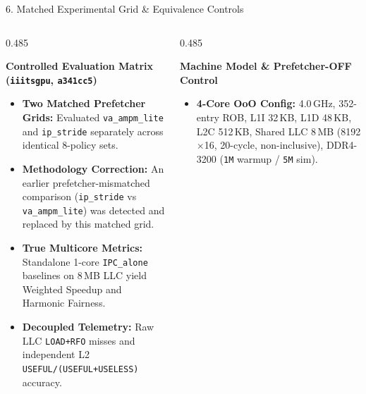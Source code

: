 \documentclass[aspectratio=169, 10pt]{beamer}
\begin{document}
\begin{frame}{6. Matched Experimental Grid \& Equivalence Controls}
  \vspace{-0.15cm}
  \begin{columns}[t, onlytextwidth]
    \begin{column}{0.485\textwidth}
      \begin{tcolorbox}[archpanel]
        {\footnotesize\raggedright\textbf{\color{Obsidian}Controlled Evaluation Matrix (\texttt{iiitsgpu}, \texttt{a341cc5})}\par}\vspace{0.06cm}
        \begin{itemize}\setlength{\itemsep}{0.16em}\scriptsize
          \item \textbf{Two Matched Prefetcher Grids:} Evaluated \texttt{va\_ampm\_lite} and \texttt{ip\_stride} separately across identical 8-policy sets.
          \item \textbf{Methodology Correction:} An earlier prefetcher-mismatched comparison (\texttt{ip\_stride} vs \texttt{va\_ampm\_lite}) was detected and replaced by this matched grid.
          \item \textbf{True Multicore Metrics:} Standalone 1-core \texttt{IPC\_alone} baselines on 8\,MB LLC yield Weighted Speedup and Harmonic Fairness.
          \item \textbf{Decoupled Telemetry:} Raw LLC \texttt{LOAD+RFO} misses and independent L2 \texttt{USEFUL/(USEFUL+USELESS)} accuracy.
        \end{itemize}
      \end{tcolorbox}
    \end{column}%
    \hfill%
    \begin{column}{0.485\textwidth}
      \begin{tcolorbox}[tealpanel]
        {\footnotesize\textbf{\color{Obsidian}Machine Model \& Prefetcher-OFF Control}}\par\vspace{0.06cm}
        \begin{itemize}\setlength{\itemsep}{0.16em}\scriptsize
          \item \textbf{4-Core OoO Config:} 4.0\,GHz, 352-entry ROB, L1I 32\,KB, L1D 48\,KB, L2C 512\,KB, Shared LLC 8\,MB (8192$\times$16, 20-cycle, non-inclusive), DDR4-3200 (\texttt{1M} warmup / \texttt{5M} sim).

\end{itemize}
\end{tcolorbox}
\end{column}
\end{columns}
\end{frame}
\end{document}
